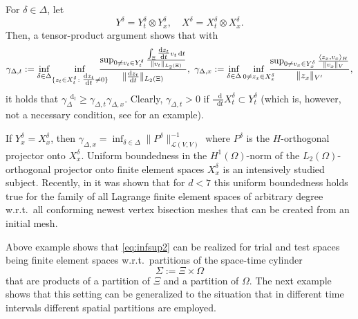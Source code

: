 \documentclass{amsart}
\numberwithin{equation}{section}
\newcommand{\cL}{\mathcal L}
\newcommand{\1}{\mathbb 1}
\newcommand*\diff{\mathop{}\!\mathrm{d}}
\begin{document}
\begin{example} \label{ex:tensor}
For $\delta \in \Delta$, let 
$$
Y^\delta = Y_t^\delta \otimes Y_x^\delta,\quad X^\delta = X_t^\delta \otimes X_x^\delta.
$$
Then, a tensor-product argument shows that with
$$
\gamma_{\Delta,t}:=\inf_{\delta \in \Delta} \! \inf_{\{z_t \in X_t^\delta\colon \tfrac{\diff z_t}{\diff t} \neq 0\}}\hspace*{-1.2em}\frac{\sup_{0 \neq v_t \in Y_t^\delta} \frac{\int_\Xi \tfrac{\diff z_t}{\diff t} v_t\diff t}{{\|v_t\|_{L_2(\Xi)}}}}{\|\tfrac{\diff z_t}{\diff t}\|_{L_2(\Xi)}}, \,\,
\gamma_{\Delta,x}:=\inf_{\delta \in \Delta}\inf_{0 \neq z_x \in X_x^\delta}\hspace*{-0.8em}\frac{\sup_{0 \neq v_x \in Y_x^\delta} \frac{\langle z_x, v_x\rangle_H}{\|v_x\|_V}}{\|z_x\|_{V'}},
$$
it holds that $\gamma^{\diff_t}_\Delta \geq \gamma_{\Delta,t} \gamma_{\Delta,x}$.
Clearly, $\gamma_{\Delta,t} >0$ if $\frac{\diff}{\diff t} X_t^\delta \subset Y_t^\delta$ (which is, however, not a necessary condition, see \cite[Prop.~6.1]{11} for an example).

If $Y_x^\delta=X_x^\delta$, then $\gamma_{\Delta,x}=\inf_{\delta \in \Delta} \|P^\delta\|_{\cL(V,V)}^{-1}$ where $P^\delta$ is the $H$-orthogonal projector onto $X_x^\delta$.
Uniform boundedness in the $H^1(\Omega)$-norm of the $L_2(\Omega)$-orthogonal projector onto finite element spaces $X_x^\delta$ is an intensively studied subject.
Recently, in \cite{64.596} it was shown that for $d<7$ this uniform boundedness holds true for the family of all Lagrange finite element spaces of arbitrary degree w.r.t.~all conforming newest vertex bisection meshes that can be created from an initial mesh.
\end{example}

Above example shows that \eqref{eq:infsup2} can be realized for trial and test spaces being finite element spaces w.r.t.~partitions of the space-time cylinder 
$$
\Sigma:=\Xi \times \Omega
$$
that are products of a partition of $\Xi$ and a partition of $\Omega$. The next example shows that this setting can be generalized to the situation that in different time intervals different spatial partitions are employed.
\end{document}
